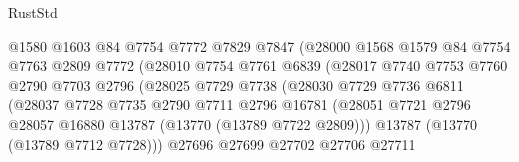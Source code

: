 \begin{lexlean}{RustStd}
\begin{coremodule}
                                  @1580
                                  @1603
                                  @84
                                  @7754
                                  @7772
                                  @7829
                                  @7847
                                  (@28000
                                    @1568
                                    @1579
                                    @84
                                    @7754
                                    @7763
                                    @2809
                                    @7772
                                    (@28010
                                      @7754
                                      @7761
                                      @6839
                                      (@28017
                                        @7740
                                        @7753
                                        @7760
                                        @2790
                                        @7703
                                        @2796
                                        (@28025
                                          @7729
                                          @7738
                                          (@28030
                                            @7729
                                            @7736
                                            @6811
                                            (@28037
                                              @7728
                                              @7735
                                              @2790
                                              @7711
                                              @2796
                                              @16781
                                              (@28051
                                                @7721
                                                @2796
                                                @28057
                                                @16880
                                                @13787
                                                (@13770 (@13789 @7722 @2809)))
                                              @13787
                                              (@13770 (@13789 @7712 @7728)))
                                            @27696
                                            @27699
                                            @27702
                                            @27706
                                            @27711

\end{coremodule}
\end{lexlean}

